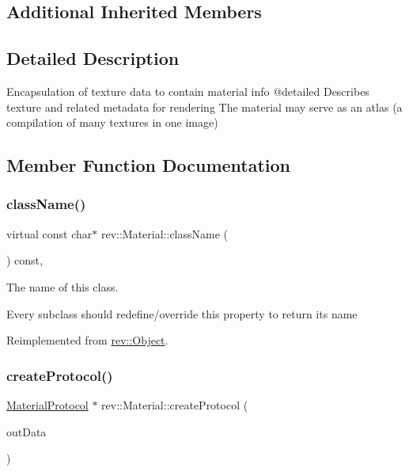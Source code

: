 \subsection*{Additional Inherited Members}


\subsection{Detailed Description}
Encapsulation of texture data to contain material info @detailed Describes texture and related metadata for rendering The material may serve as an atlas (a compilation of many textures in one image) 

\subsection{Member Function Documentation}
\mbox{\label{classrev_1_1_material_a353022875d44b057bf6de6c3c95fd5b9}} 
\subsubsection{\texorpdfstring{className()}{className()}}
{\footnotesize\ttfamily virtual const char$\ast$ rev\+::\+Material\+::class\+Name (\begin{DoxyParamCaption}{ }\end{DoxyParamCaption}) const\hspace{0.3cm}{\ttfamily [inline]}, {\ttfamily [virtual]}}



The name of this class. 

Every subclass should redefine/override this property to return its name 

Reimplemented from \mbox{\hyperlink{classrev_1_1_object_a7a2013f91169479b65cf93afdc5d9a68}{rev\+::\+Object}}.

\mbox{\label{classrev_1_1_material_af5481a063b935c733334c6ca74853c86}} 
\subsubsection{\texorpdfstring{createProtocol()}{createProtocol()}}
{\footnotesize\ttfamily \mbox{\hyperlink{classrev_1_1_protocol}{Material\+Protocol}} $\ast$ rev\+::\+Material\+::create\+Protocol (\begin{DoxyParamCaption}\item[{\mbox{\hyperlink{structrev_1_1_material_data}{Material\+Data}} \&}]{out\+Data }\end{DoxyParamCaption})}



